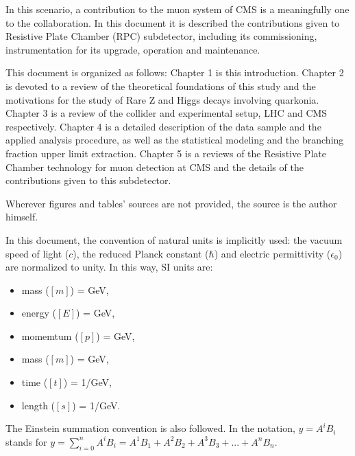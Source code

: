 In this scenario, a contribution to the muon system of CMS is a meaningfully one to the collaboration. In this document it is described the contributions given to Resistive Plate Chamber (RPC) subdetector, including its commissioning, instrumentation for its upgrade, operation and maintenance.

This document is organized as follows: Chapter 1 is this introduction. Chapter 2 is devoted to a review of the theoretical foundations of this study and the motivations for the study of Rare Z and Higgs decays involving quarkonia. Chapter 3 is a review of the collider and experimental setup, LHC and CMS respectively. Chapter 4 is a detailed description of the data sample and the applied analysis procedure, as well as the statistical modeling and the branching fraction upper limit extraction. Chapter 5 is a reviews of the Resistive Plate Chamber technology for muon detection at CMS and the details of the contributions given to this subdetector.

Wherever figures and tables' sources are not provided, the source is the author himself.

In this document, the convention of natural units is implicitly used: the vacuum speed of light ($c$), the reduced Planck constant ($\hbar$) and electric permittivity ($\epsilon_{0}$) are normalized to unity. In this way, SI units are:
\begin{itemize}
    \setlength\itemsep{-0.5em}
    \item mass ($[m]$) = GeV,
    \item energy ($[E]$) = GeV,
    \item momemtum ($[p]$) = GeV,
    \item mass ($[m]$) = GeV,
    \item time ($[t]$) = 1/GeV,
    \item length ($[s]$) = 1/GeV.
\end{itemize}

The Einstein summation convention is also followed. In the notation, $y = A^i B_i$ stands for $y = \sum_{i=0}^n A^i B_i = A^1 B_1 + A^2 B_2 + A^3 B_3 + ... + A^n B_n$.